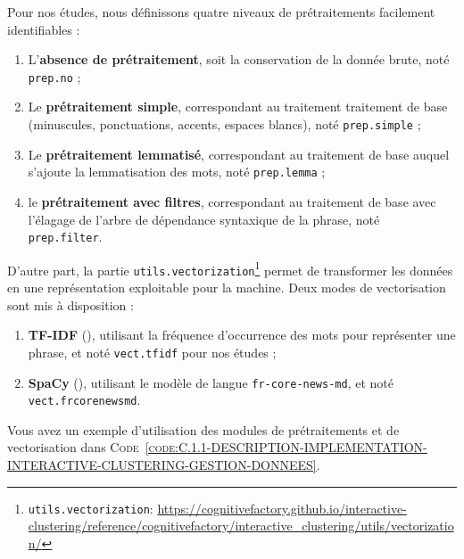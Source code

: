 	Pour nos études, nous définissons quatre niveaux de prétraitements facilement identifiables :
	\begin{enumerate}
		\item L'\textbf{absence de prétraitement}, soit la conservation de la donnée brute, noté \texttt{prep.no} ;
		\item Le \textbf{prétraitement simple}, correspondant au traitement traitement de base (minuscules, ponctuations, accents, espaces blancs), noté \texttt{prep.simple} ; 
		\item Le \textbf{prétraitement lemmatisé}, correspondant au traitement de base auquel s'ajoute la lemmatisation des mots, noté \texttt{prep.lemma} ;
		\item le \textbf{prétraitement avec filtres}, correspondant au traitement de base avec l'élagage de l'arbre de dépendance syntaxique de la phrase, noté \texttt{prep.filter}.
	\end{enumerate}
	
	
	D'autre part, la partie \texttt{utils.vectorization}\footnote{
		\texttt{utils.vectorization}: \url{https://cognitivefactory.github.io/interactive-clustering/reference/cognitivefactory/interactive_clustering/utils/vectorization/}
	} permet de transformer les données en une représentation exploitable pour la machine.
	Deux modes de vectorisation sont mis à disposition :
	\begin{enumerate}
		\item \textbf{TF-IDF} (\cite{ramos:2003:using-tfidf-determine}), utilisant la fréquence d'occurrence des mots pour représenter une phrase, et noté \texttt{vect.tfidf} pour nos études ;
		\item \textbf{SpaCy} (\cite{honnibal-montani:2017:spacy-natural-language}), utilisant le modèle de langue \texttt{fr-core-news-md}, et noté \texttt{vect.frcorenewsmd}.
	\end{enumerate}
	
	Vous avez un exemple d'utilisation des modules de prétraitements et de vectorisation dans \textsc{Code~\ref{code:C.1.1-DESCRIPTION-IMPLEMENTATION-INTERACTIVE-CLUSTERING-GESTION-DONNEES}}.
	
